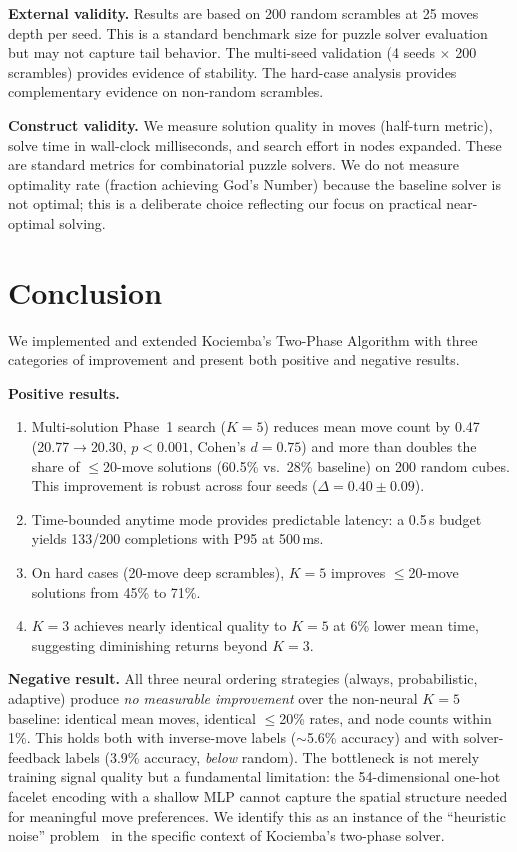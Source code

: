 \documentclass[10pt,twocolumn,a4paper]{article}
\begin{document}
\textbf{External validity.} Results are based on 200 random scrambles at 25 moves depth per seed. This is a standard benchmark size for puzzle solver evaluation but may not capture tail behavior. The multi-seed validation (4 seeds $\times$ 200 scrambles) provides evidence of stability. The hard-case analysis provides complementary evidence on non-random scrambles.

\textbf{Construct validity.} We measure solution quality in moves (half-turn metric), solve time in wall-clock milliseconds, and search effort in nodes expanded. These are standard metrics for combinatorial puzzle solvers. We do not measure optimality rate (fraction achieving God's Number) because the baseline solver is not optimal; this is a deliberate choice reflecting our focus on practical near-optimal solving.

\section{Conclusion}
\label{sec:conclusion}

We implemented and extended Kociemba's Two-Phase Algorithm with three categories of improvement and present both positive and negative results.

\textbf{Positive results.}
\begin{enumerate}[leftmargin=*]
  \item Multi-solution Phase~1 search ($K{=}5$) reduces mean move count by 0.47 (20.77$\to$20.30, $p < 0.001$, Cohen's $d = 0.75$) and more than doubles the share of $\leq$20-move solutions (60.5\% vs.\ 28\% baseline) on 200 random cubes. This improvement is robust across four seeds ($\Delta = 0.40 \pm 0.09$).
  \item Time-bounded anytime mode provides predictable latency: a 0.5\,s budget yields 133/200 completions with P95 at 500\,ms.
  \item On hard cases (20-move deep scrambles), $K{=}5$ improves $\leq$20-move solutions from 45\% to 71\%.
  \item $K{=}3$ achieves nearly identical quality to $K{=}5$ at 6\% lower mean time, suggesting diminishing returns beyond $K{=}3$.
\end{enumerate}

\textbf{Negative result.} All three neural ordering strategies (always, probabilistic, adaptive) produce \emph{no measurable improvement} over the non-neural $K{=}5$ baseline: identical mean moves, identical $\leq$20\% rates, and node counts within 1\%. This holds both with inverse-move labels ($\sim$5.6\% accuracy) and with solver-feedback labels (3.9\% accuracy, \emph{below} random). The bottleneck is not merely training signal quality but a fundamental limitation: the 54-dimensional one-hot facelet encoding with a shallow MLP cannot capture the spatial structure needed for meaningful move preferences. We identify this as an instance of the ``heuristic noise'' problem~\cite{shen2020} in the specific context of Kociemba's two-phase solver.
\end{document}

